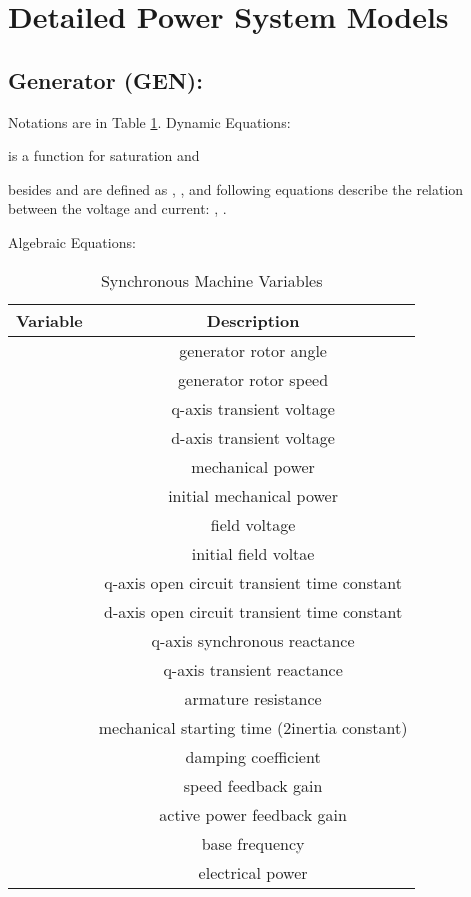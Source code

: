 \documentclass[journal]{IEEEtran}
\begin{document}
\appendices
\section{Detailed Power System Models\cite{Cutsem:book}\cite{Milano:article}}
\subsection{Generator (GEN):}
Notations are in Table \ref{appedixtable1}.
Dynamic Equations:

 is a function for saturation and


besides  and  are defined as
, ,
and following equations describe the relation between the voltage and current:
,
.


Algebraic Equations:


\begin{table}[!ht]
\centering
\caption{Synchronous Machine Variables}\label{appedixtable1}
\begin{tabular}{|c|c|}
\hline
Variable&Description\\
\hline
&generator rotor angle\\
\hline
&generator rotor speed\\
\hline
&q-axis transient voltage\\
\hline
&d-axis transient voltage\\
\hline
&mechanical power\\
\hline
&initial mechanical power\\
\hline
&field voltage\\
\hline
&initial field voltae\\
\hline
&q-axis open circuit transient time constant\\
\hline
&d-axis open circuit transient time constant\\
\hline
&q-axis synchronous reactance\\
\hline
&q-axis transient reactance\\
\hline
&armature resistance\\
\hline
&mechanical starting time (2inertia constant)\\
\hline
&damping coefficient\\
\hline
&speed feedback gain\\
\hline
&active power feedback gain\\
\hline
&base frequency\\
\hline
&electrical power\\
\hline
\end{tabular}
\end{table}
\end{document}
